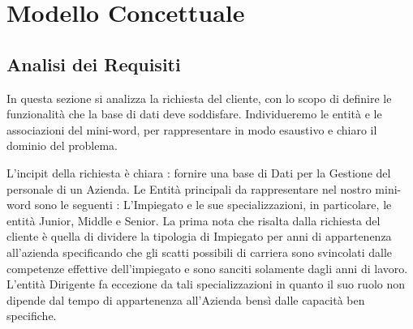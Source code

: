 \section{Modello Concettuale}

\subsection{Analisi dei Requisiti}

In questa sezione si analizza la richiesta del cliente, con lo scopo di definire le funzionalità che la base di dati deve soddisfare. Individueremo le entità e le associazioni del mini-word, per rappresentare in modo esaustivo e chiaro il dominio del problema. 


L'incipit della richiesta è chiara : fornire una base di Dati per la Gestione del personale di un Azienda. Le Entità principali da rappresentare nel nostro mini-word sono le seguenti :  
L'Impiegato e le sue specializzazioni, in particolare, le entità Junior, Middle e Senior. 
La prima nota che risalta dalla richiesta del cliente è quella di dividere la tipologia di Impiegato per anni di appartenenza all'azienda specificando che gli scatti possibili di carriera sono svincolati dalle competenze effettive dell'impiegato e sono sanciti solamente dagli anni di lavoro. L'entità Dirigente fa eccezione da tali specializzazioni in quanto il suo ruolo non dipende dal tempo di appartenenza all'Azienda bensì dalle capacità ben specifiche.


